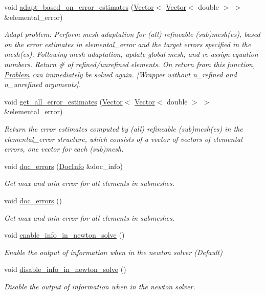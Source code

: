 \begin{DoxyCompactItemize}
void \hyperlink{classoomph_1_1Problem_a7bf1b55fe1bb0cc02fd0b7a868a58c3b}{adapt\+\_\+based\+\_\+on\+\_\+error\+\_\+estimates} (\hyperlink{classoomph_1_1Vector}{Vector}$<$ \hyperlink{classoomph_1_1Vector}{Vector}$<$ double $>$ $>$ \&elemental\+\_\+error)
\begin{DoxyCompactList}\small\item\em Adapt problem\+: Perform mesh adaptation for (all) refineable (sub)mesh(es), based on the error estimates in elemental\+\_\+error and the target errors specified in the mesh(es). Following mesh adaptation, update global mesh, and re-\/assign equation numbers. Return \# of refined/unrefined elements. On return from this function, \hyperlink{classoomph_1_1Problem}{Problem} can immediately be solved again. \mbox{[}Wrapper without n\+\_\+refined and n\+\_\+unrefined arguments\mbox{]}. \end{DoxyCompactList}\item 
void \hyperlink{classoomph_1_1Problem_a5e58bd6dcb1ff9ef54cf504984fb5f9e}{get\+\_\+all\+\_\+error\+\_\+estimates} (\hyperlink{classoomph_1_1Vector}{Vector}$<$ \hyperlink{classoomph_1_1Vector}{Vector}$<$ double $>$ $>$ \&elemental\+\_\+error)
\begin{DoxyCompactList}\small\item\em Return the error estimates computed by (all) refineable (sub)mesh(es) in the elemental\+\_\+error structure, which consists of a vector of vectors of elemental errors, one vector for each (sub)mesh. \end{DoxyCompactList}\item 
void \hyperlink{classoomph_1_1Problem_af2a77519885ccb13e4644c89b19c37a7}{doc\+\_\+errors} (\hyperlink{classoomph_1_1DocInfo}{Doc\+Info} \&doc\+\_\+info)
\begin{DoxyCompactList}\small\item\em Get max and min error for all elements in submeshes. \end{DoxyCompactList}\item 
void \hyperlink{classoomph_1_1Problem_af2a9dfdb7b4f95bb941d48411f955f55}{doc\+\_\+errors} ()
\begin{DoxyCompactList}\small\item\em Get max and min error for all elements in submeshes. \end{DoxyCompactList}\item 
void \hyperlink{classoomph_1_1Problem_a3226bf49118c8a4f02dbe01d22428f20}{enable\+\_\+info\+\_\+in\+\_\+newton\+\_\+solve} ()
\begin{DoxyCompactList}\small\item\em Enable the output of information when in the newton solver (Default) \end{DoxyCompactList}\item 
void \hyperlink{classoomph_1_1Problem_af00e3623681347439fe3dac650423bbe}{disable\+\_\+info\+\_\+in\+\_\+newton\+\_\+solve} ()
\begin{DoxyCompactList}\small\item\em Disable the output of information when in the newton solver. \end{DoxyCompactList}\end{DoxyCompactItemize}
